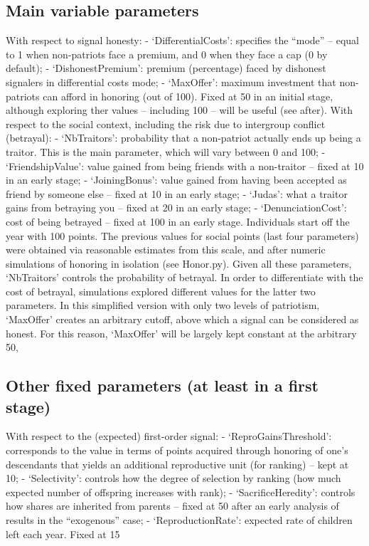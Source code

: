 \documentclass[a4paper,12pt]{report}
\begin{document}
\subsection{Main variable parameters}
With respect to signal honesty:
	- ‘DifferentialCosts’: specifies the “mode” – equal to 1 when non-patriots 	face a premium, and 0 when they face a cap (0 by default);
	- ‘DishonestPremium’: premium (percentage) faced by dishonest 	signalers in differential costs mode;
	- ‘MaxOffer’: maximum investment that non-patriots can afford in 	honoring (out of 100). Fixed at 50 in an initial stage, although exploring  	ther values – including 100 – will be useful (see after).
With respect to the social context, including the risk due to intergroup conflict (betrayal):
	- ‘NbTraitors’: probability that a non-patriot actually ends up being a 	traitor. This is the main parameter, which will vary between 0 and 100;
	- ‘FriendshipValue’: value gained from being friends with a non-traitor – 	fixed at 10 in an early stage;
	- ‘JoiningBonus’: value gained from having been accepted as friend by 	someone else – fixed at 10 in an early stage;
	- ‘Judas’: what a traitor gains from betraying you – fixed at 20 in an early 	stage;
	- ‘DenunciationCost’: cost of being betrayed – fixed at 100 in an early 	stage.
Individuals start off the year with 100 points. The previous values for social points (last four parameters) were obtained via reasonable estimates from this scale, and after numeric simulations of honoring in isolation (see Honor.py). Given all these parameters, ‘NbTraitors’ controls the probability of betrayal. In order to differentiate with the cost of betrayal, simulations explored different values for the latter two parameters.
In this simplified version with only two levels of patriotism, ‘MaxOffer’ creates an arbitrary cutoff, above which a signal can be considered as honest. For this reason, ‘MaxOffer’ will be largely kept constant at the arbitrary 50, 


\subsection{Other fixed parameters (at least in a first stage)}
With respect to the (expected) first-order signal:
	- ‘ReproGainsThreshold’: corresponds to the value in terms of points 	acquired through honoring of one’s descendants that yields an 	additional reproductive unit (for ranking) – kept at 10;
	- ‘Selectivity’: controls how the degree of selection by ranking (how 	much expected number of offspring increases with rank);
	- ‘SacrificeHeredity’: controls how shares are inherited from parents 	 – fixed at 50 after an early analysis of results in the 	“exogenous” case;
	- ‘ReproductionRate’: expected rate of children left each year. Fixed at 	15%
\end{document}
